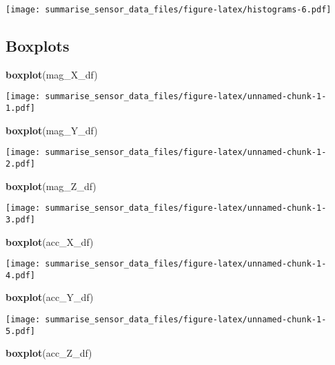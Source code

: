 \documentclass[]{article}
\newenvironment{Shaded}{\begin{snugshade}}{\end{snugshade}}
\newcommand{\KeywordTok}[1]{\textcolor[rgb]{0.13,0.29,0.53}{\textbf{#1}}}
\newcommand{\NormalTok}[1]{#1}
\begin{document}
\texttt{[image: summarise\_sensor\_data\_files/figure-latex/histograms-6.pdf]}

\hypertarget{boxplots}{%
\subsection{Boxplots}\label{boxplots}}

\begin{Shaded}
\begin{Highlighting}[]
\KeywordTok{boxplot}\NormalTok{(mag_X_df)}
\end{Highlighting}
\end{Shaded}

\texttt{[image: summarise\_sensor\_data\_files/figure-latex/unnamed-chunk-1-1.pdf]}

\begin{Shaded}
\begin{Highlighting}[]
\KeywordTok{boxplot}\NormalTok{(mag_Y_df)}
\end{Highlighting}
\end{Shaded}

\texttt{[image: summarise\_sensor\_data\_files/figure-latex/unnamed-chunk-1-2.pdf]}

\begin{Shaded}
\begin{Highlighting}[]
\KeywordTok{boxplot}\NormalTok{(mag_Z_df)}
\end{Highlighting}
\end{Shaded}

\texttt{[image: summarise\_sensor\_data\_files/figure-latex/unnamed-chunk-1-3.pdf]}

\begin{Shaded}
\begin{Highlighting}[]
\KeywordTok{boxplot}\NormalTok{(acc_X_df)}
\end{Highlighting}
\end{Shaded}

\texttt{[image: summarise\_sensor\_data\_files/figure-latex/unnamed-chunk-1-4.pdf]}

\begin{Shaded}
\begin{Highlighting}[]
\KeywordTok{boxplot}\NormalTok{(acc_Y_df)}
\end{Highlighting}
\end{Shaded}

\texttt{[image: summarise\_sensor\_data\_files/figure-latex/unnamed-chunk-1-5.pdf]}

\begin{Shaded}
\begin{Highlighting}[]
\KeywordTok{boxplot}\NormalTok{(acc_Z_df)}
\end{Highlighting}
\end{Shaded}
\end{document}

